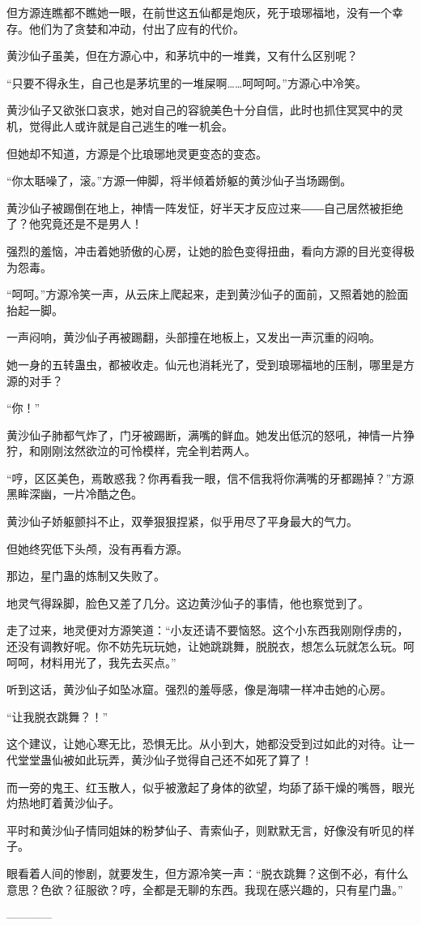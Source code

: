 \begin{this_body}
但方源连瞧都不瞧她一眼，在前世这五仙都是炮灰，死于琅琊福地，没有一个幸存。他们为了贪婪和冲动，付出了应有的代价。

黄沙仙子虽美，但在方源心中，和茅坑中的一堆粪，又有什么区别呢？

“只要不得永生，自己也是茅坑里的一堆屎啊……呵呵呵。”方源心中冷笑。

黄沙仙子又欲张口哀求，她对自己的容貌美色十分自信，此时也抓住冥冥中的灵机，觉得此人或许就是自己逃生的唯一机会。

但她却不知道，方源是个比琅琊地灵更变态的变态。

“你太聒噪了，滚。”方源一伸脚，将半倾着娇躯的黄沙仙子当场踢倒。

黄沙仙子被踢倒在地上，神情一阵发怔，好半天才反应过来――自己居然被拒绝了？他究竟还是不是男人！

强烈的羞恼，冲击着她骄傲的心房，让她的脸色变得扭曲，看向方源的目光变得极为怨毒。

“呵呵。”方源冷笑一声，从云床上爬起来，走到黄沙仙子的面前，又照着她的脸面抬起一脚。

一声闷响，黄沙仙子再被踢翻，头部撞在地板上，又发出一声沉重的闷响。

她一身的五转蛊虫，都被收走。仙元也消耗光了，受到琅琊福地的压制，哪里是方源的对手？

“你！”

黄沙仙子肺都气炸了，门牙被踢断，满嘴的鲜血。她发出低沉的怒吼，神情一片狰狞，和刚刚泫然欲泣的可怜模样，完全判若两人。

“哼，区区美色，焉敢惑我？你再看我一眼，信不信我将你满嘴的牙都踢掉？”方源黑眸深幽，一片冷酷之色。

黄沙仙子娇躯颤抖不止，双拳狠狠捏紧，似乎用尽了平身最大的气力。

但她终究低下头颅，没有再看方源。

那边，星门蛊的炼制又失败了。

地灵气得跺脚，脸色又差了几分。这边黄沙仙子的事情，他也察觉到了。

走了过来，地灵便对方源笑道：“小友还请不要恼怒。这个小东西我刚刚俘虏的，还没有调教好呢。你不妨先玩玩她，让她跳跳舞，脱脱衣，想怎么玩就怎么玩。呵呵呵，材料用光了，我先去买点。”

听到这话，黄沙仙子如坠冰窟。强烈的羞辱感，像是海啸一样冲击她的心房。

“让我脱衣跳舞？！”

这个建议，让她心寒无比，恐惧无比。从小到大，她都没受到过如此的对待。让一代堂堂蛊仙被如此玩弄，黄沙仙子觉得自己还不如死了算了！

而一旁的鬼王、红玉散人，似乎被激起了身体的欲望，均舔了舔干燥的嘴唇，眼光灼热地盯着黄沙仙子。

平时和黄沙仙子情同姐妹的粉梦仙子、青索仙子，则默默无言，好像没有听见的样子。

眼看着人间的惨剧，就要发生，但方源冷笑一声：“脱衣跳舞？这倒不必，有什么意思？色欲？征服欲？哼，全都是无聊的东西。我现在感兴趣的，只有星门蛊。”

------------

\end{this_body}

